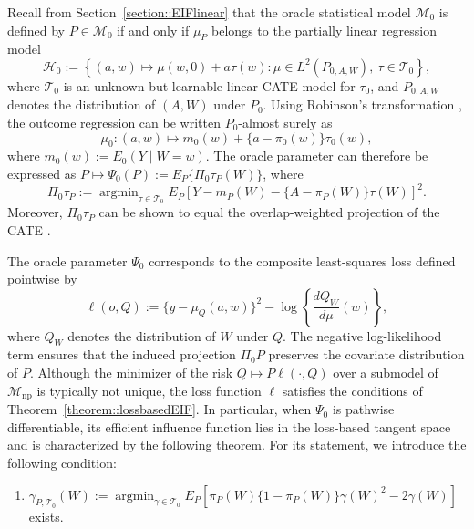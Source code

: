 \documentclass[11pt]{article}
\DeclareMathOperator*{\argmin}{argmin}
\theoremstyle{definition}
\begin{document}
    



Recall from Section~\ref{section::EIFlinear} that the oracle statistical model \(\mathcal{M}_0\) is defined by \(P \in \mathcal{M}_0\) if and only if \(\mu_P\) belongs to the partially linear regression model
\[
\mathcal{H}_0 := \left\{(a,w) \mapsto \mu(w,0) + a\tau(w) : \mu \in L^2(P_{0,A,W}),\ \tau \in \mathcal{T}_0 \right\},
\]
where \(\mathcal{T}_0\) is an unknown but learnable linear CATE model for \(\tau_0\), and \(P_{0,A,W}\) denotes the distribution of \((A,W)\) under \(P_0\). Using Robinson's transformation \citep{robinson1988root}, the outcome regression can be written \(P_0\)-almost surely as
\[
\mu_0:(a,w)\mapsto m_0(w) + \{a - \pi_0(w)\}\tau_0(w),
\]
where \(m_0(w):=E_0(Y \mid W=w)\). The oracle parameter can therefore be expressed as \(P \mapsto \Psi_0(P) := E_P\{\Pi_0\tau_P(W)\}\), where
\[
\Pi_0\tau_P := \argmin_{\tau \in \mathcal{T}_0} E_P \left[Y - m_P(W) - \{A - \pi_P(W)\}\tau(W)\right]^2.
\]
Moreover, \(\Pi_0\tau_P\) can be shown to equal the overlap-weighted projection of the CATE \citep{imbensOverlapEstimand2006,li2019overlapWeights,d2021overlap,morzywolek2023general}.

The oracle parameter \(\Psi_0\) corresponds to the composite least-squares loss defined pointwise by
\[
\ell(o, Q) := \{y-\mu_Q(a,w)\}^2 - \log\left\{\frac{dQ_W}{d\mu}(w)\right\},
\]
where \(Q_W\) denotes the distribution of \(W\) under \(Q\). The negative log-likelihood term ensures that the induced projection \(\Pi_0 P\) preserves the covariate distribution of \(P\). Although the minimizer of the risk \(Q \mapsto P\ell(\cdot,Q)\) over a submodel of \(\mathcal{M}_{\mathrm{np}}\) is typically not unique, the loss function \(\ell\) satisfies the conditions of Theorem~\ref{theorem::lossbasedEIF}. In particular, when \(\Psi_0\) is pathwise differentiable, its efficient influence function lies in the loss-based tangent space and is characterized by the following theorem. For its statement, we introduce the following condition:
\begin{enumerate}[label=(E\arabic*), ref=E\arabic*,series=condE]
 \item $\gamma_{P, \mathcal{T}_0}(W) := \argmin_{\gamma \in \mathcal{T}_0} E_P\left[\pi_P(W)\{1-\pi_P(W)\}\gamma(W)^2 -  2 \gamma(W) \right]$ exists. \label{cond::CATE::boundedFunc1}
\end{enumerate}
  
\end{document}
